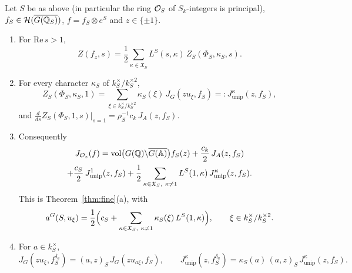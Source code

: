 \begin{proposition}\label{prop:unipotent}
Let $S$ be as above (in particular the ring $\mathcal{O}_S$ of $S_k$-integers is
principal), $f_S\in\mathcal H(\overline{G(\mathbb{Q}_S)})$, $f=f_S\otimes e^S$ and
$z\in\{\pm1\}$.
\begin{enumerate}[label=(\alph*)]
\item For $\mathrm{Re}\,s>1$,
  \[
  Z(f_z,s)=\frac12\sum_{\kappa\in\mathfrak X_S}L^S(s,\kappa)\,
  Z_S(\Phi_S,\kappa_S,s).
  \]
\item For every character $\kappa_S$ of $k_S^\times/k_S^{\times2}$,
  \[
  Z_S(\Phi_S,\kappa_S,1)=\sum_{\xi\in k_S^\times/k_S^{\times2}}\kappa_S(\xi)\,
  J_G(zu_\xi,f_S)=:J^\kappa_{\mathrm{unip}}(z,f_S),
  \]
  and $\frac{d}{ds}Z_S(\Phi_S,1,s)\big|_{s=1}=\rho_S^{-1}c_k\,J_A(z,f_S)$.
\item Consequently
  \begin{multline*}
  J_{\mathcal O_z}(f)=\operatorname{vol}\bigl(G(\mathbb{Q})\backslash\overline{G(\mathbb{A})}\bigr)f_S(z)
  +\frac{c_k}2\,J_A(z,f_S)\\
  +\frac{c_S}2\,J^1_{\mathrm{unip}}(z,f_S)
  +\frac12\sum_{\kappa\in\mathfrak X_S,\ \kappa\ne1}L^S(1,\kappa)\,
  J^\kappa_{\mathrm{unip}}(z,f_S).
  \end{multline*}
  This is Theorem~\ref{thm:fine}(a), with
  \[
  a^G(S,u_\xi)=\frac12\Bigl(c_S+\sum_{\kappa\in\mathfrak X_S,\ \kappa\ne1}
  \kappa_S(\xi)\,L^S(1,\kappa)\Bigr),\qquad\xi\in k_S^\times/k_S^{\times2}.
  \]
\item For $a\in k_S^\times$,
  \[
  J_G(zu_\xi,f_S^{\delta_a})=(a,z)_S\,J_G(zu_{a\xi},f_S),\qquad
  J^\kappa_{\mathrm{unip}}(z,f_S^{\delta_a})=\kappa_S(a)\,(a,z)_S\,
  J^\kappa_{\mathrm{unip}}(z,f_S).
  \]
\end{enumerate}
\end{proposition}

